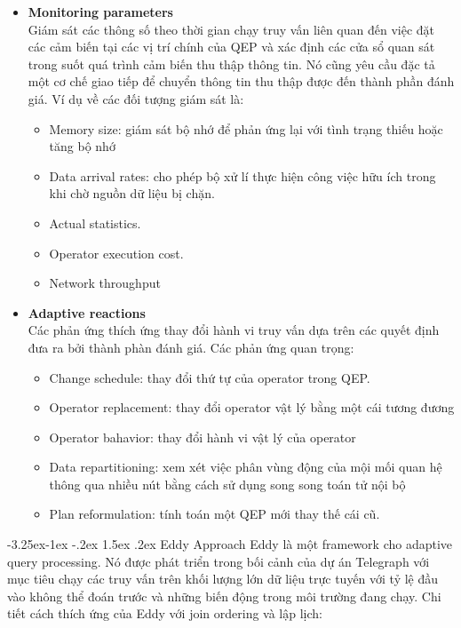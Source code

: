 \documentclass[a4paper]{article}
\makeatletter
\newcounter {subsubsubsection}[subsubsection]
\newcommand\subsubsubsection{\@startsection{subsubsubsection}{4}{\z@}%
                                     {-3.25ex\@plus -1ex \@minus -.2ex}%
                                     {1.5ex \@plus .2ex}%
                                     {\normalfont\normalsize\bfseries}}
\makeatother
\begin{document}
\begin{itemize}
    \item \textbf{Monitoring parameters}\\
    Giám sát các thông số theo thời gian chạy truy vấn liên quan đến việc đặt các cảm biến tại các vị trí chính của QEP và xác định các cửa sổ quan sát trong suốt quá trình cảm biến thu thập thông tin. Nó cũng yêu cầu đặc tả một cơ chế giao tiếp để chuyển thông tin thu thập được đến thành phần đánh giá. Ví dụ về các đối tượng giám sát là:
    \begin{itemize}
        \item Memory size: giám sát bộ nhớ để phản ứng lại với tình trạng thiếu hoặc tăng bộ nhớ
        \item Data arrival rates: cho phép bộ xử lí thực hiện công việc hữu ích trong khi chờ nguồn dữ liệu bị chặn.
        \item Actual statistics.
        \item Operator execution cost.
        \item Network throughput
    \end{itemize}
    \item \textbf{Adaptive reactions}\\
    Các phản ứng thích ứng thay đổi hành vi truy vấn dựa trên các quyết định đưa ra bởi thành phàn đánh giá. Các phản ứng quan trọng:
    \begin{itemize}
        \item Change schedule: thay đổi thứ tự của operator trong QEP.
        \item Operator replacement: thay đổi operator vật lý bằng một cái tương đương
        \item Operator bahavior: thay đổi hành vi vật lý của operator
        \item Data repartitioning: xem xét việc phân vùng động của mội mối quan hệ thông qua nhiều nút bằng cách sử dụng song song toán tử nội bộ
        \item Plan reformulation: tính toán một QEP mới thay thế cái cũ.
    \end{itemize}

\end{itemize}
\subsubsubsection{Eddy Approach}
Eddy là một framework cho adaptive query processing. Nó được phát triển trong bối cảnh của dự án Telegraph với mục tiêu chạy các truy vấn trên khối lượng lớn dữ liệu trực tuyến với tỷ lệ đầu vào không thể đoán trước và những biến động trong môi trường đang chạy. Chi tiết cách thích ứng của Eddy với join ordering và lập lịch:
\end{document}
